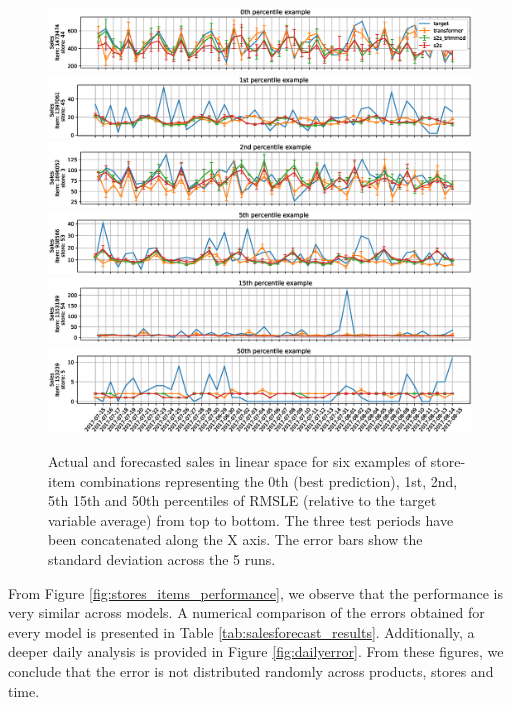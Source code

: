 \begin{figure}
\centering
\includegraphics[width=1\linewidth]{salesforecast/images/sample_0_lin}
\includegraphics[width=1\linewidth]{salesforecast/images/sample_1_lin}
\includegraphics[width=1\linewidth]{salesforecast/images/sample_2_lin}
\includegraphics[width=1\linewidth]{salesforecast/images/sample_3_lin}
\includegraphics[width=1\linewidth]{salesforecast/images/sample_4_lin}
\includegraphics[width=1\linewidth]{salesforecast/images/sample_5_lin}
\caption{Actual and forecasted sales in linear space for six examples of store-item combinations representing the 0th (best prediction), 1st, 2nd, 5th 15th and 50th percentiles of RMSLE (relative to the target variable average) from top to bottom. The three test periods have been concatenated along the X axis. The error bars show the standard deviation across the 5 runs.}
\label{fig:ts_lin}
\end{figure}

From Figure \ref{fig:stores_items_performance}, we observe that the performance is very similar across models. A numerical comparison of the errors obtained for every model is presented in Table \ref{tab:salesforecast_results}. Additionally, a deeper daily analysis is provided in Figure \ref{fig:dailyerror}. From these figures, we conclude that the error is not distributed randomly across products, stores and time.

